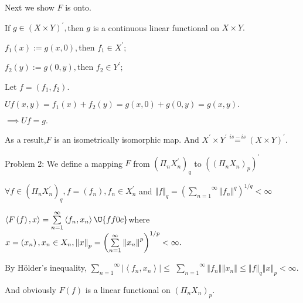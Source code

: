 \documentclass{article}
\begin{document}
Next we show $F$ is onto.

If $g\in \left( X\times Y\right) ^{\prime },$then $g$ is a continuous linear
functional on $X\times Y.$

$f_{1}\left( x\right) :=g(x,0),$then $f_{1}\in X^{\prime };$

$f_{2}\left( y\right) :=g(0,y),$then $f_{2}\in Y^{\prime };$

Let $f=\left( f_{1},f_{2}\right) .$

$Uf\left( x,y\right) =f_{1}\left( x\right) +f_{2}\left( y\right) =g\left(
x,0\right) +g\left( 0,y\right) =g(x,y).$

$\implies Uf=g.$

As a result,$F$ is an isometrically isomorphic map. And $X^{\prime }\times
Y^{\prime }\overset{is-is}{=}\left( X\times Y\right) ^{\prime }.$

\bigskip {}

\bigskip Problem 2: We define a mapping $F$ from $\left( \Pi
_{n}X_{n}^{\prime }\right) _{q}$ to $\left( \left( \Pi _{n}X_{n}\right)
_{p}\right) ^{\prime }$

$\forall f\in \left( \Pi _{n}X_{n}^{\prime }\right) _{q},f=\left(
f_{n}\right) ,f_{n}\in X_{n}^{\prime }$ and $\left\Vert f\right\Vert
_{q}=\left( \overset{\infty }{\underset{n=1}{\sum }}\left\Vert
f_{n}\right\Vert ^{q}\right) ^{1/q}<\infty $

$\left\langle F\left( f\right) ,x\right\rangle =\overset{\infty }{\underset{%
n=1}{\sum }}\left\langle f_{n},x_{n}\right\rangle \U{ff0c} $where $x=\left(
x_{n}\right) ,x_{n}\in X_{n},\left\Vert x\right\Vert _{p}=\left( \overset{%
\infty }{\underset{n=1}{\sum }}\left\Vert x_{n}\right\Vert ^{p}\right)
^{1/p}<\infty .$

By H\"{o}lder's inequality, $\overset{\infty }{\underset{n=1}{\sum }}%
\left\vert \left\langle f_{n},x_{n}\right\rangle \right\vert \leq $ $\overset%
{\infty }{\underset{n=1}{\sum }}\left\Vert f_{n}\right\Vert \left\Vert
x_{n}\right\Vert \leq \left\Vert f\right\Vert _{q}\left\Vert x\right\Vert
_{p}<\infty .$

And obviously $F\left( f\right) $ is a linear functional on $\left( \Pi
_{n}X_{n}\right) _{p}.$
\end{document}
